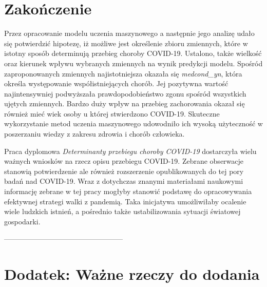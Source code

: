 \documentclass[polish, twoside, 12pt, a4paper]{article}
\theoremstyle{definition}
\theoremstyle{plain}
\theoremstyle{remark}
\begin{document}
\clearpage
\section{Zakończenie}

Przez opracowanie modelu uczenia maszynowego a następnie jego analizę udało się potwierdzić hipotezę, iż możliwe jest określenie zbioru zmiennych, które w istotny sposób determinują przebieg choroby COVID-19. Ustalono, także wielkość oraz kierunek wpływu wybranych zmiennych na wynik predykcji modelu. Spośród zaproponowanych zmiennych najistotniejsza okazała się \emph{medcond\_yn}, która określa występowanie współistniejących chorób. Jej pozytywna wartość najintensywniej podwyższała prawdopodobieństwo zgonu spośród wszystkich ujętych zmiennych. Bardzo duży wpływ na przebieg zachorowania okazał się również mieć wiek osoby u której stwierdzono COVID-19. Skuteczne wykorzystanie metod uczenia maszynowego udowodniło ich wysoką użyteczność w poszerzaniu wiedzy z zakresu zdrowia i chorób człowieka.

Praca dyplomowa \emph{Determinanty przebiegu choroby COVID-19} dostarczyła wielu ważnych wniosków na rzecz opisu przebiegu COVID-19. Zebrane obserwacje stanowią potwierdzenie ale również rozszerzenie opublikowanych do tej pory badań nad COVID-19. Wraz z dotychczas znanymi materiałami naukowymi informację zebrane w tej pracy mogłyby stanowić podstawę do opracowywania efektywnej strategi walki z pandemią. Taka inicjatywa umożliwiłaby ocalenie wiele ludzkich istnień, a pośrednio także ustabilizowania sytuacji światowej gospodarki. 



-------------------------------------------------- 

\appendix

\clearpage
\section{Dodatek: Ważne rzeczy do dodania}
 



\clearpage


\end{document}

